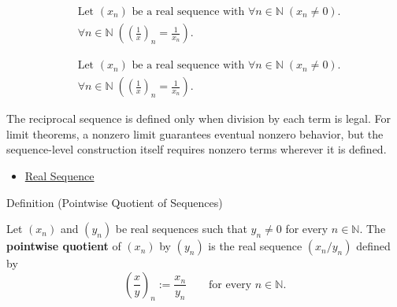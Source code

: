 \begin{remark*}
\[
\begin{aligned}
&\text{Let } (x_n) \text{ be a real sequence with }
  \forall n\in\mathbb{N}\;(x_n\neq 0).\\
&\forall n\in\mathbb{N}\;
\left(\left(\frac{1}{x}\right)_n=\frac{1}{x_n}\right).
\end{aligned}
\]
\end{remark*}

\begin{remark*}
\[
\begin{aligned}
&\text{Let } (x_n) \text{ be a real sequence with }
  \forall n\in\mathbb{N}\;(x_n\neq 0).\\
&\forall n\in\mathbb{N}\;
\left(\left(\frac{1}{x}\right)_n=\frac{1}{x_n}\right).
\end{aligned}
\]
\end{remark*}

\begin{remark*}[Interpretation]
The reciprocal sequence is defined only when division by each term is legal.
For limit theorems, a nonzero limit guarantees eventual nonzero behavior, but
the sequence-level construction itself requires nonzero terms wherever it is
defined.
\end{remark*}

\begin{dependencies}
\begin{itemize}
  \item \hyperref[def:real-sequence]{Real Sequence}
\end{itemize}
\end{dependencies}


\begin{definitionbox}{Definition (Pointwise Quotient of Sequences)}
\begin{definition}
\label{def:pointwise-quotient-sequence}
Let $(x_n)$ and $(y_n)$ be real sequences such that $y_n\neq 0$ for every
$n\in\mathbb{N}$. The \textbf{pointwise quotient} of $(x_n)$ by $(y_n)$ is
the real sequence $(x_n/y_n)$ defined by
\[
\left(\frac{x}{y}\right)_n := \frac{x_n}{y_n}
\qquad
\text{for every } n\in\mathbb{N}.
\]
\end{definition}
\end{definitionbox}

